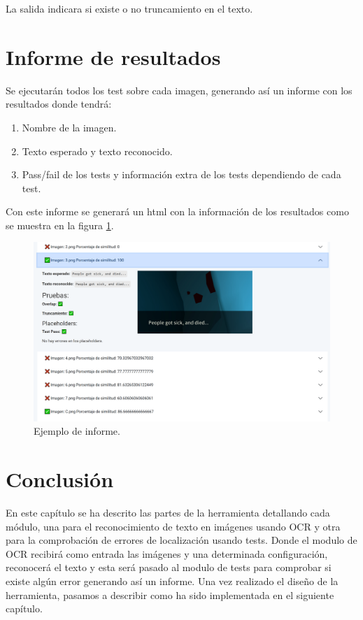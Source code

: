 La salida indicara si existe o no truncamiento en el texto.

\section{Informe de resultados}
Se ejecutarán todos los test sobre cada imagen, generando así un informe con los resultados donde tendrá:
\begin{enumerate}
	\item Nombre de la imagen.
	\item Texto esperado y texto reconocido.
	\item Pass/fail de los tests y información extra de los tests dependiendo de cada test.
\end{enumerate}
Con este informe se generará un html con la información de los resultados como se muestra en la figura \ref{fig:Descripcion_Informe}.
\begin{figure}[H]
	\centering
	\includegraphics[width = 1\textwidth]{Imagenes/Des_Informe.png}
	\caption{Ejemplo de informe.}
	\label{fig:Descripcion_Informe}
\end{figure}
\section{Conclusión}
En este capítulo se ha descrito las partes de la herramienta detallando cada módulo, una para el reconocimiento de texto en imágenes usando OCR y otra para la comprobación de errores de localización usando tests. Donde el modulo de OCR recibirá como entrada las imágenes y una determinada configuración, reconocerá el texto y esta será pasado al modulo de tests para comprobar si existe algún error generando así un informe.
Una vez realizado el diseño de la herramienta, pasamos a describir como ha sido implementada en el siguiente capítulo.
 

